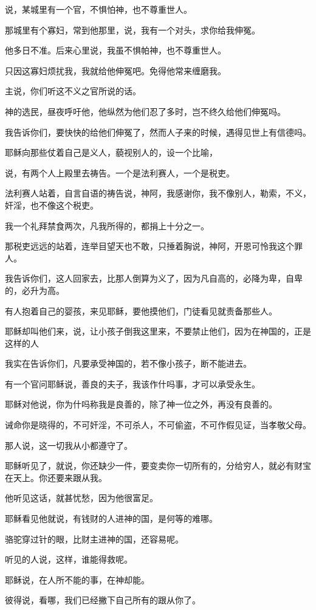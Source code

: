 \documentclass[12pt,oneside]{book}
\begin{document}
说，某城里有一个官，不惧怕神，也不尊重世人。

那城里有个寡妇，常到他那里，说，我有一个对头，求你给我伸冤。

他多日不准。后来心里说，我虽不惧帕神，也不尊重世人。

只因这寡妇烦扰我，我就给他伸冤吧。免得他常来缠磨我。

主说，你们听这不义之官所说的话。

神的选民，昼夜呼吁他，他纵然为他们忍了多时，岂不终久给他们伸冤吗。

我告诉你们，要快快的给他们伸冤了，然而人子来的时候，遇得见世上有信德吗。

耶稣向那些仗着自己是义人，藐视别人的，设一个比喻，

说，有两个人上殿里去祷告。一个是法利赛人，一个是税吏。

法利赛人站着，自言自语的祷告说，神阿，我感谢你，我不像别人，勒索，不义，奸淫，也不像这个税吏。

我一个礼拜禁食两次，凡我所得的，都捐上十分之一。

那税吏远远的站着，连举目望天也不敢，只捶着胸说，神阿，开恩可怜我这个罪人。

我告诉你们，这人回家去，比那人倒算为义了，因为凡自高的，必降为卑，自卑的，必升为高。

有人抱着自己的婴孩，来见耶稣，要他摸他们，门徒看见就责备那些人。

耶稣却叫他们来，说，让小孩子倒我这里来，不要禁止他们，因为在神国的，正是这样的人

我实在告诉你们，凡要承受神国的，若不像小孩子，断不能进去。

有一个官问耶稣说，善良的夫子，我该作什吗事，才可以承受永生。

耶稣对他说，你为什吗称我是良善的，除了神一位之外，再没有良善的。

诫命你是晓得的，不可奸淫，不可杀人，不可偷盗，不可作假见证，当孝敬父母。

那人说，这一切我从小都遵守了。

耶稣听见了，就说，你还缺少一件，要变卖你一切所有的，分给穷人，就必有财宝在天上。你还要来跟从我。

他听见这话，就甚忧愁，因为他很富足。

耶稣看见他就说，有钱财的人进神的国，是何等的难哪。

骆驼穿过针的眼，比财主进神的国，还容易呢。

听见的人说，这样，谁能得救呢。

耶稣说，在人所不能的事，在神却能。

彼得说，看哪，我们已经撇下自己所有的跟从你了。
\end{document}
